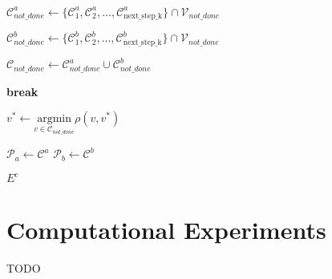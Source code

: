 \documentclass{article}
\begin{document}
\begin{algorithm}
\begin{algorithmic}[1]
        \State $\mathcal{C}^a_{not\_done} \gets \{\mathcal{C}^a_1, \mathcal{C}^a_2, ..., \mathcal{C}^a_{ \text{next\_step\_k} } \} \cap \mathcal{V}_{not\_done}$

        \State $\mathcal{C}^b_{not\_done} \gets \{\mathcal{C}^b_1, \mathcal{C}^b_2, ..., \mathcal{C}^b_{ \text{next\_step\_k} } \}  \cap \mathcal{V}_{not\_done}$
        
        
        \State $\mathcal{C}_{not\_done} \gets \mathcal{C}^a_{not\_done} \cup \mathcal{C}^b_{not\_done}$
        
            \State \textbf{break}
        \EndIf
        
        \State $v^* \gets \underset{v \in \mathcal{C}_{not\_done}}{\mathrm{argmin}} \rho(v, v^*)$
        
        \State $\mathcal{P}_a \gets \mathcal{C}^a$
        \State $\mathcal{P}_b \gets \mathcal{C}^b$
    \EndWhile
\EndWhile

\State \Return $E^c$


\end{algorithmic}
\end{algorithm}

\section{Computational Experiments}
TODO






\end{document}
